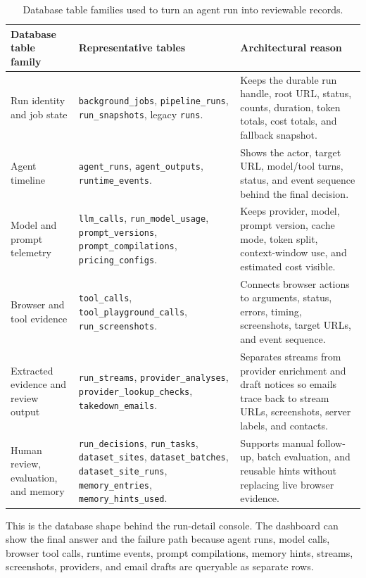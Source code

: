 \begin{table}[H]
\centering
\scriptsize
\setlength{\tabcolsep}{3.5pt}
\renewcommand{\arraystretch}{0.94}
\begin{tabularx}{\textwidth}{Q{3.05cm} Y Y}
\toprule
{}
Database table family & Representative tables & Architectural reason \\
\midrule
Run identity and job state &
\texttt{background\_jobs}, \texttt{pipeline\_runs}, \texttt{run\_snapshots},
legacy \texttt{runs}. &
Keeps the durable run handle, root URL, status, counts, duration, token totals,
cost totals, and fallback snapshot. \\
Agent timeline &
\texttt{agent\_runs}, \texttt{agent\_outputs}, \texttt{runtime\_events}. &
Shows the actor, target URL, model/tool turns, status, and event sequence behind
the final decision. \\
Model and prompt telemetry &
\texttt{llm\_calls}, \texttt{run\_model\_usage}, \texttt{prompt\_versions},
\texttt{prompt\_compilations}, \texttt{pricing\_configs}. &
Keeps provider, model, prompt version, cache mode, token split, context-window
use, and estimated cost visible. \\
Browser and tool evidence &
\texttt{tool\_calls}, \texttt{tool\_playground\_calls},
\texttt{run\_screenshots}. &
Connects browser actions to arguments, status, errors, timing, screenshots,
target URLs, and event sequence. \\
Extracted evidence and review output &
\texttt{run\_streams}, \texttt{provider\_analyses},
\texttt{provider\_lookup\_checks}, \texttt{takedown\_emails}. &
Separates streams from provider enrichment and draft notices so emails trace
back to stream URLs, screenshots, server labels, and contacts. \\
Human review, evaluation, and memory &
\texttt{run\_decisions}, \texttt{run\_tasks}, \texttt{dataset\_sites},
\texttt{dataset\_batches}, \texttt{dataset\_site\_runs},
\texttt{memory\_entries}, \texttt{memory\_hints\_used}. &
Supports manual follow-up, batch evaluation, and reusable hints without replacing
live browser evidence. \\
\bottomrule
\end{tabularx}
\caption{Database table families used to turn an agent run into reviewable records.}\label{tab:database-table-families}
\end{table}

This is the database shape behind the run-detail console. The dashboard can show
the final answer and the failure path because agent runs, model calls, browser
tool calls, runtime events, prompt compilations, memory hints, streams,
screenshots, providers, and email drafts are queryable as separate rows.

